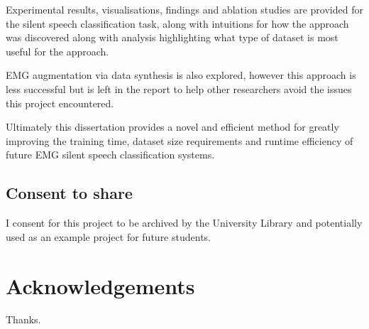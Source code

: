 \documentclass[12pt, a4paper]{report}
\begin{document}
Experimental results, visualisations, findings
and ablation studies are provided
for the silent speech classification task, along with intuitions for how the
approach was discovered along with analysis highlighting what type
of dataset is most useful for the approach.

EMG augmentation via data synthesis is also explored, however this approach
is less successful but is left in the report to help other researchers avoid
the issues this project encountered.

Ultimately this dissertation provides a novel and efficient method for greatly
improving the training time, dataset size requirements
and runtime efficiency of future EMG silent speech classification systems.

\vspace{10mm}
\section*{Consent to share}
I consent for this project to be archived by the University Library and potentially used as an example project for future students.

\newpage
\renewcommand{\contentsname}{Table of Contents}	%
\tableofcontents

\newpage
{}	%
\listoftables

\newpage
{}	%
\listoffigures


\newpage

{}
\chapter*{Acknowledgements}
Thanks.
\newpage


\end{document}

